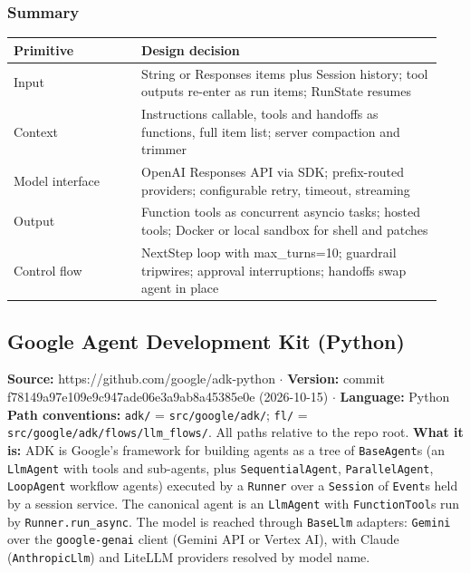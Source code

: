 \subsubsection*{Summary}
\begin{longtable}{@{}p{0.28\linewidth}p{0.66\linewidth}@{}}
\toprule \textbf{Primitive} & \textbf{Design decision} \\ \midrule \endhead
Input & String or Responses items plus Session history; tool outputs re-enter as run items; RunState resumes \\
Context & Instructions callable, tools and handoffs as functions, full item list; server compaction and trimmer \\
Model interface & OpenAI Responses API via SDK; prefix-routed providers; configurable retry, timeout, streaming \\
Output & Function tools as concurrent asyncio tasks; hosted tools; Docker or local sandbox for shell and patches \\
Control flow & NextStep loop with max\_turns=10; guardrail tripwires; approval interruptions; handoffs swap agent in place \\
\bottomrule \end{longtable}


\subsection{Google Agent Development Kit (Python)}

\textbf{Source:} https://github.com/google/adk-python $\cdot$ \textbf{Version:} commit f78149a97e109e9c947ade06e3a9ab8a45385e0e (2026-10-15) $\cdot$ \textbf{Language:} Python
\textbf{Path conventions:} \texttt{adk/\allowbreak{}} = \texttt{src/\allowbreak{}google/\allowbreak{}adk/\allowbreak{}}; \texttt{fl/\allowbreak{}} = \texttt{src/\allowbreak{}google/\allowbreak{}adk/\allowbreak{}flows/\allowbreak{}llm\_\allowbreak{}flows/\allowbreak{}}. All paths relative to the repo root.
\textbf{What it is:} ADK is Google's framework for building agents as a tree of \texttt{BaseAgent}s (an \texttt{LlmAgent} with tools and sub-agents, plus \texttt{SequentialAgent}, \texttt{ParallelAgent}, \texttt{LoopAgent} workflow agents) executed by a \texttt{Runner} over a \texttt{Session} of \texttt{Event}s held by a session service. The canonical agent is an \texttt{LlmAgent} with \texttt{FunctionTool}s run by \texttt{Runner.\allowbreak{}run\_\allowbreak{}async}. The model is reached through \texttt{BaseLlm} adapters: \texttt{Gemini} over the \texttt{google-\allowbreak{}genai} client (Gemini API or Vertex AI), with Claude (\texttt{AnthropicLlm}) and LiteLLM providers resolved by model name.

